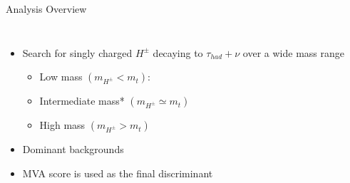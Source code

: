\documentclass[aspectratio=169,xcolor=table]{beamer}
\begin{document}
    \begin{frame}[t]{Analysis Overview}
      \begin{columns}[t]

            \vspace{-20mm}
            \begin{itemize}
              \item Search for singly charged $H^{\pm}$ decaying to $\tau_{had} + \nu$ over a wide mass range
                \begin{itemize}
                  \item Low mass $ (m_{H^{\pm}} < m_{t})$:
                  \item Intermediate mass*  $(m_{H^{\pm}} \simeq m_{t})$
                  \item High mass $(m_{H^{\pm}} > m_{t})$
                \end{itemize}
              \item Dominant backgrounds
              \vspace{-3mm}
            \begin{table}
              \tiny
            \end{table}
            \item MVA score is used as the final discriminant 
            \end{itemize}


\end{columns}
\end{frame}
\end{document}
